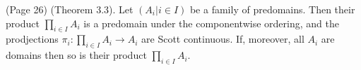 (Page 26) (Theorem 3.3). Let $(A_i | i \in I)$ be a family of predomains. Then their product $\prod_{i \in I} A_i$ is a predomain
    under the componentwise ordering, and the prodjections $\pi_i : \prod_{i \in I} A_i \to A_i$ are Scott continuous. If, moreover, all $A_i$ are domains then so is their product $\prod_{i \in I} A_i$.